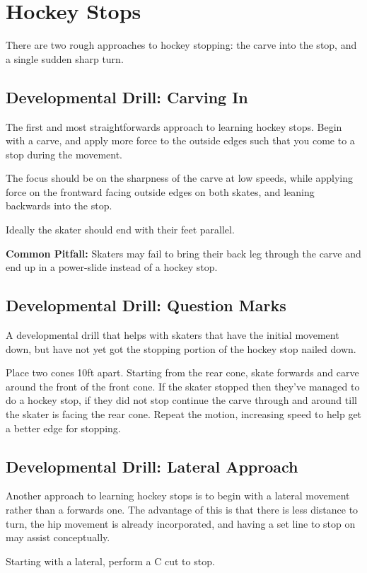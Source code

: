 \section{Hockey Stops}
\label{sec:stopping/hockey}

There are two rough approaches to hockey stopping: the carve into the stop, and a single sudden sharp turn.   

\subsection*{Developmental Drill: Carving In} 

The first and most straightforwards approach to learning hockey stops.
Begin with a carve, and apply more force to the outside edges such that you come to a stop during the movement.   

The focus should be on the sharpness of the carve at low speeds, while applying force on the frontward facing outside edges on both skates, and leaning backwards into the stop. 

Ideally the skater should end with their feet parallel.

{\bf Common Pitfall:} Skaters may fail to bring their back leg through the carve and end up in a power-slide instead of a hockey stop. 


\subsection*{Developmental Drill: Question Marks} 

A developmental drill that helps with skaters that have the initial movement down, but have not yet got the stopping portion of the hockey stop nailed down.      

Place two cones 10ft apart. 
Starting from the rear cone, skate forwards and carve around the front of the front cone.       
If the skater stopped then they've managed to do a hockey stop, if they did not stop continue the carve through and around till the skater is facing the rear cone. 
Repeat the motion, increasing speed to help get a better edge for stopping.



\subsection*{Developmental Drill: Lateral Approach} 

Another approach to learning hockey stops is to begin with a lateral movement rather than a forwards one.    
The advantage of this is that there is less distance to turn, the hip movement is already incorporated, and having a set line to stop on may assist conceptually.   


Starting with a lateral, perform a C cut to stop. 
